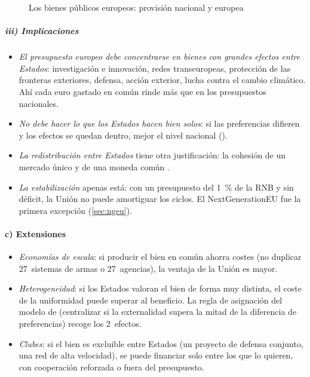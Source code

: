 \documentclass[11pt]{article}
\begin{document}
\begin{figure}[H]
\centering
\caption{Los bienes públicos europeos: provisión nacional y europea}\label{fig:bienes-publicos}
\end{figure}

\subparagraph{iii) Implicaciones}

\begin{itemize}
\item \emph{El presupuesto europeo debe concentrarse en bienes con grandes efectos entre Estados}: investigación e innovación, redes transeuropeas, protección de las fronteras exteriores, defensa, acción exterior, lucha contra el cambio climático. Ahí cada euro gastado en común rinde más que en los presupuestos nacionales.
\item \emph{No debe hacer lo que los Estados hacen bien solos}: si las preferencias difieren y los efectos se quedan dentro, mejor el nivel nacional ().
\item \emph{La redistribución entre Estados} tiene otra justificación: la cohesión de un mercado único y de una moneda común .
\item \emph{La estabilización} apenas está: con un presupuesto del 1~\% de la RNB y sin déficit, la Unión no puede amortiguar los ciclos. El NextGenerationEU fue la primera excepción (\ref{sec:ngeu}).
\end{itemize}

\paragraph{c) Extensiones}

\begin{itemize}
\item \emph{Economías de escala}: si producir el bien en común ahorra costes (no duplicar 27~sistemas de armas o 27~agencias), la ventaja de la Unión es mayor.
\item \emph{Heterogeneidad}: si los Estados valoran el bien de forma muy distinta, el coste de la uniformidad puede superar al beneficio. La regla de asignación del modelo de  (centralizar si la externalidad supera la mitad de la diferencia de preferencias) recoge los 2~efectos.
\item \emph{Clubes}: si el bien es excluible entre Estados (un proyecto de defensa conjunto, una red de alta velocidad), se puede financiar solo entre los que lo quieren, con cooperación reforzada o fuera del presupuesto.
\end{itemize}
\end{document}
